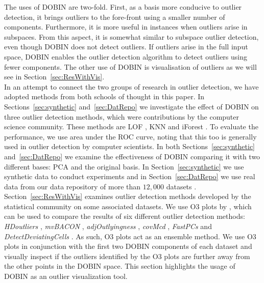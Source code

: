 \documentclass[11pt]{article}
\begin{document}
The uses of DOBIN are two-fold. First, as a basis more conducive to outlier detection, it brings outliers to the fore-front using a smaller number of components. Furthermore, it is more useful in instances when outliers arise  in subspaces. From this aspect, it is somewhat similar to subspace outlier detection, even though DOBIN does not detect outliers.  If outliers arise in the full input space,  DOBIN  enables the outlier detection algorithm to detect outliers using fewer components. The other use of DOBIN is  visualisation of outliers as we will see in Section~\ref{sec:ResWithVis}.  \\ 

In an attempt to connect the two groups of research in outlier detection, we have adopted methods from both schools of thought in this paper. In Sections~\ref{sec:synthetic} and~\ref{sec:DatRepo} we investigate the effect of DOBIN on three outlier detection methods, which were contributions by the computer science community. These methods are LOF \citep{breunig2000lof}, KNN \citep{ramaswamy2000efficient} and iForest \citep{liu2008isolation}. To evaluate the performance, we use  area under the ROC curve, noting that this too is generally used in outlier detection by computer scientists. In both Sections~\ref{sec:synthetic} and~\ref{sec:DatRepo} we examine the effectiveness of DOBIN comparing it with two different bases: PCA and the original basis.  In Section~\ref{sec:synthetic} we use synthetic data to conduct experiments  and in Section~\ref{sec:DatRepo} we use real data from our data repository of more than $12,000$ datasets \citep{datasets}. \\

Section~\ref{sec:ResWithVis} examines outlier detection methods developed by the statistical community on some associated datasets. We use O3 plots by  \cite{unwin2019multivariate}, which can be used to compare the results of six different outlier detection methods: \textit{HDoutliers} \citep{wilkinson2017visualizing}, \textit{mvBACON} \citep{billor2000bacon},  \textit{adjOutlyingness} \citep{brys2005robustification}, \textit{covMcd} \citep{rousseeuw1999fast} , \textit{FastPCs} \citep{vakili2014finding} and \textit{DetectDeviatingCells} \citep{rousseeuw2018detecting}. As such, O3 plots act as an ensemble method. We use O3 plots in conjunction with the first two DOBIN components of each dataset and visually inspect if the outliers identified by the O3 plots are further away from the other points in the DOBIN space. This section highlights the usage of DOBIN as an outlier visualization tool.   \\
\end{document}
